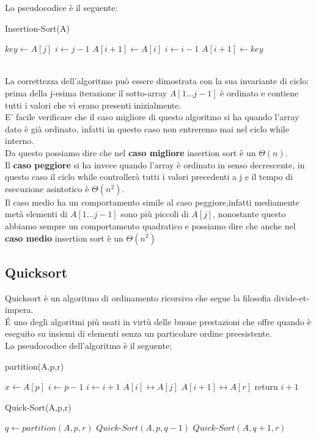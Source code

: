 \documentclass[]{article}
\begin{document}
Lo pseudocodice è il seguente:\\
\begin{algorithm}
\caption{Insertion-Sort(A)}
\begin{algorithmic}[1]
	\STATE $key \leftarrow A[j]$
	\STATE $i \leftarrow j - 1$
		\STATE	$A[i+1] \leftarrow A[i]$
		\STATE $ i \leftarrow i - 1$
	\ENDWHILE
	\STATE $ A[i+1] \leftarrow key$
\ENDFOR 
\end{algorithmic}
\end{algorithm}
\\
La correttezza dell'algoritmo può essere dimostrata con la sua invariante di ciclo:\\ prima della j-esima iterazione il sotto-array $A[1 ... j-1]$ è ordinato e contiene tutti i valori che vi erano presenti inizialmente.\\
E' facile verificare che il caso migliore di questo algoritmo si ha quando l'array dato è già ordinato, infatti in questo caso non entreremo mai nel ciclo while interno.\\
Da questo possiamo dire che nel \textbf{caso migliore} insertion sort è un $\Theta(n)$.\\
Il \textbf{caso peggiore} si ha invece quando l'array è ordinato in senso decrescente, in questo caso il ciclo while controllerà tutti i valori precedenti a j e il tempo di esecuzione asintotico è $\Theta(n^2)$.\\
Il caso medio ha un comportamento simile al caso peggiore,infatti mediamente metà elementi di $A[1 ... j-1]$ sono più piccoli di $A[j]$, nonostante questo abbiamo sempre un comportamento quadratico e possiamo dire che anche nel \textbf{caso medio} insertion sort è un $\Theta(n^2)$
\subsection{Quicksort}
Quicksort è un algoritmo di ordinamento ricorsivo che segue la filosofia divide-et-impera.\\
\'E uno degli algoritmi più usati in virtù delle buone prestazioni che offre quando è eseguito su insiemi di elementi senza un particolare ordine preesistente.\\
Lo pseudocodice dell'algoritmo è il seguente:

\begin{algorithm}
\caption{partition(A,p,r)}
\begin{algorithmic}[1]
\STATE $x \leftarrow A[p]$
\STATE $i \leftarrow p-1$
		\STATE $i \leftarrow i + 1$
		\STATE $A[i] \leftrightarrow A[j]$
	\ENDIF
\ENDFOR
\STATE $A[i+1] \leftrightarrow A[r]$
\STATE return $i+1$
\end{algorithmic}
\end{algorithm}
\newpage
\begin{algorithm}
\caption{Quick-Sort(A,p,r)}
\begin{algorithmic}[1]
	\STATE $q \leftarrow partition(A,p,r)$
	\STATE $Quick\mbox{-}Sort(A,p,q-1)$
	\STATE $Quick\mbox{-}Sort(A,q+1,r)$
\ENDIF
\end{algorithmic}
\end{algorithm}
\end{document}
